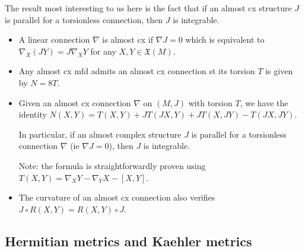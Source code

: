 \documentclass{report}
\theoremstyle{definition}
\begin{document}
The result most interesting to us here is the fact that if an almost cx structure $J$ is parallel for a torsionless connection, then $J$ is integrable.
\begin{itemize}
    \item A linear connection $\nabla$ is almost cx if $\nabla J=0$ which is equivalent to $\nabla_X(JY)=J\nabla_XY$ for any $X,Y\in\mathfrak{X}(M)$.
    \item Any almost cx mfd admits an almost cx connection st its torsion $T$ is given by $N=8T$.
    \item Given an almost cx connection $\nabla$ on $(M,J)$ with torsion $T$, we have the identity $N(X,Y)=T(X,Y)+JT(JX,Y)+JT(X,JY)-T(JX,JY)$.

    In particular, if an almost complex structure $J$ is parallel for a torsionless connection $\nabla$ (ie $\nabla J=0$), then $J$ is integrable.

    Note: the formula is straightforwardly proven using $T(X,Y)=\nabla_XY-\nabla_YX-[X,Y]$.
    \item The curvature of an almost cx connection also verifies $J\circ R(X,Y)=R(X,Y)\circ J$.
\end{itemize}

\subsection{Hermitian metrics and Kaehler metrics}
\end{document}
